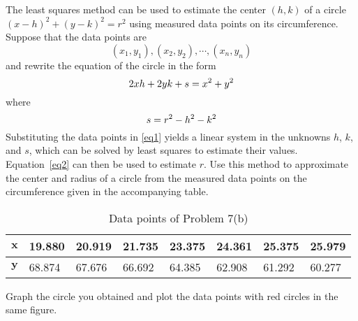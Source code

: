 \begin{exer}
The least squares method can be used to estimate the center $(h,k)$ of a circle $(x-h)^2+(y-k)^2=r^2$ using measured data points on its circumference. Suppose that the data points are
$$(x_1, y_1), (x_2, y_2), \cdots, (x_n, y_n)$$
and rewrite the equation of the circle in the form
\begin{equation}\label{eq1}\centering  2xh+2yk+s=x^2+y^2
\end{equation}
where
\begin{equation}\label{eq2}\centering s=r^2-h^2-k^2\end{equation}
Substituting the data points in \eqref{eq1} yields a linear system in the unknowns $h$, $k$, and $s$, which can be solved by least squares to estimate their values. Equation~\eqref{eq2} can then be used to estimate $r$. Use this method to approximate the center and radius of a circle from the measured data points on the circumference given in the accompanying table.

\begin{table}[h]
\centering
\caption{Data points of Problem 7(b)}
\label{my-label}
\begin{tabular}{|l|l|l|l|l|l|l|l|}
\hline
$\mathbf{x}$ & 19.880 & 20.919 & 21.735 & 23.375 & 24.361 & 25.375 & 25.979 \\ \hline
$\mathbf{y}$ & 68.874 & 67.676 & 66.692 & 64.385 & 62.908 & 61.292 & 60.277 \\ \hline
\end{tabular}
\end{table}
Graph the circle you obtained and plot the data points with red circles in the same figure.
\end{exer}


